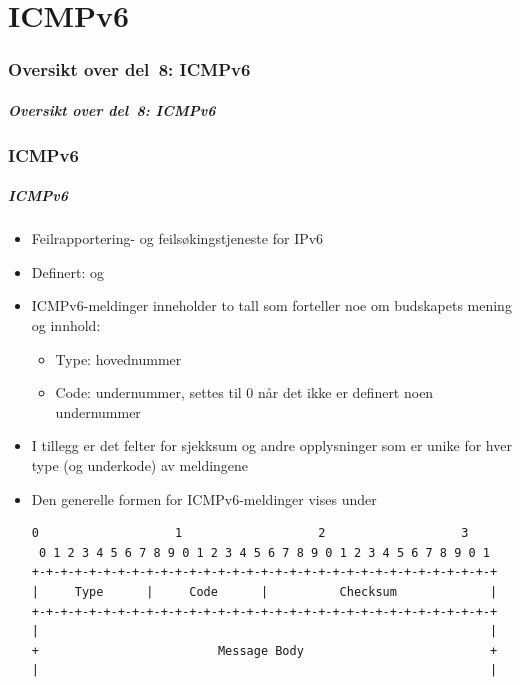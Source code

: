 \part{ICMPv6}

\begin{frame}
  \partpage
\end{frame}

\section*{Oversikt over del~8: ICMPv6}
\begin{frame}[allowframebreaks]
  \frametitle{Oversikt over del~8: ICMPv6}
    \tableofcontents%
\end{frame}

\section{ICMPv6}
\begin{frame}[fragile]%
  \frametitle{ICMPv6}
  \begin{itemize}%
  \item Feilrapportering- og feilsøkingstjeneste for IPv6
  \item Definert:  og 
  \item ICMPv6-meldinger inneholder to tall som forteller noe om
    budskapets mening og innhold:
    \begin{itemize}%
    \item Type: hovednummer
    \item Code: undernummer, settes til 0 når det ikke er definert
      noen undernummer
    \end{itemize}
  \item I tillegg er det felter for sjekksum og andre opplysninger som
    er unike for hver type (og underkode) av meldingene
  \item Den generelle formen for ICMPv6-meldinger vises under
\begin{Verbatim}[fontsize=\tiny]
 0                   1                   2                   3
 0 1 2 3 4 5 6 7 8 9 0 1 2 3 4 5 6 7 8 9 0 1 2 3 4 5 6 7 8 9 0 1
+-+-+-+-+-+-+-+-+-+-+-+-+-+-+-+-+-+-+-+-+-+-+-+-+-+-+-+-+-+-+-+-+
|     Type      |     Code      |          Checksum             |
+-+-+-+-+-+-+-+-+-+-+-+-+-+-+-+-+-+-+-+-+-+-+-+-+-+-+-+-+-+-+-+-+
|                                                               |
+                         Message Body                          +
|                                                               |
\end{Verbatim}
  \end{itemize}
\end{frame}

